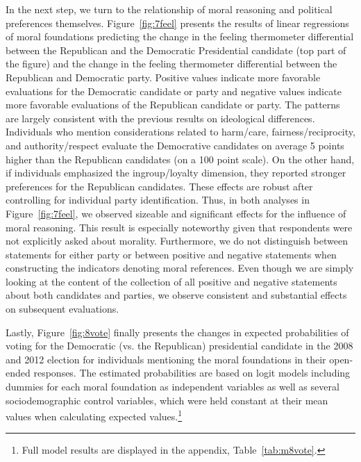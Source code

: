 \documentclass[12pt]{article}
\begin{document}
In the next step, we turn to the relationship of moral reasoning and political preferences themselves. Figure~\ref{fig:7feel} presents the results of linear regressions of moral foundations predicting the change in the feeling thermometer differential between the Republican and the Democratic Presidential candidate (top part of the figure) and the change in the feeling thermometer differential between the Republican and Democratic party. Positive values indicate more favorable evaluations for the Democratic candidate or party and negative values indicate more favorable evaluations of the Republican candidate or party. The patterns are largely consistent with the previous results on ideological differences. Individuals who mention considerations related to harm/care, fairness/reciprocity, and authority/respect evaluate the Democrative candidates on average 5 points higher than the Republican candidates (on a 100 point scale). On the other hand, if individuals emphasized the ingroup/loyalty dimension, they reported stronger preferences for the Republican candidates. These effects are robust after controlling for individual party identification. Thus, in both analyses in Figure~\ref{fig:7feel}, we observed sizeable and significant effects for the influence of moral reasoning. This result is especially noteworthy given that respondents were not explicitly asked about morality. Furthermore, we do not distinguish between statements for either party or between positive and negative statements when constructing the indicators denoting moral references. Even though we are simply looking at the content of the collection of all positive and negative statements about both candidates and parties, we observe consistent and substantial effects on subsequent evaluations.

Lastly, Figure~\ref{fig:8vote} finally presents the changes in expected probabilities of voting for the Democratic (vs. the Republican) presidential candidate in the 2008 and 2012 election for individuals mentioning the moral foundations in their open-ended responses. The estimated probabilities are based on logit models including dummies for each moral foundation as independent variables as well as several sociodemographic control variables, which were held constant at their mean values when calculating expected values.\footnote{Full model results are displayed in the appendix, Table~\ref{tab:m8vote}.}
\end{document}
